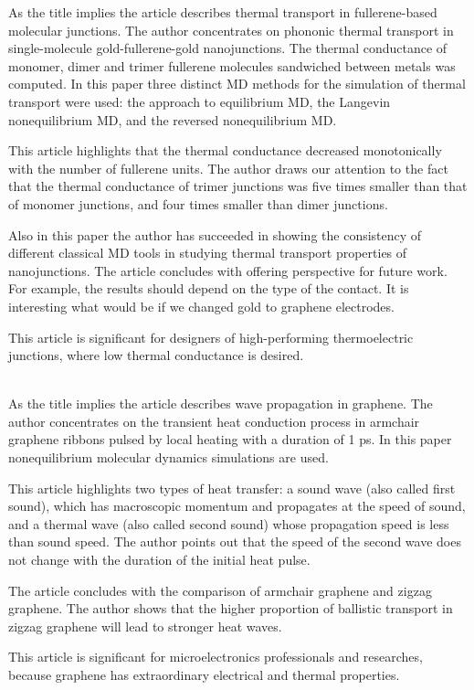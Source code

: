 \documentclass[main.tex]{subfiles}
\begin{document}
\setcounter{subsection}{2}
As the title implies the article describes thermal transport in fullerene-based molecular junctions.
The author concentrates on phononic thermal transport in single-molecule gold-fullerene-gold nanojunctions.
The thermal conductance of monomer, dimer and trimer fullerene molecules sandwiched between metals was computed.
In this paper three distinct MD methods for the simulation of thermal transport were used: the approach to equilibrium MD, the Langevin nonequilibrium MD, and the reversed nonequilibrium MD.\par
This article highlights that the thermal conductance decreased monotonically with the number of fullerene units.
The author draws our attention to the fact that the thermal conductance of trimer junctions was five times smaller than that of monomer junctions, and four times smaller than dimer junctions.\par
Also in this paper the author has succeeded in showing the consistency of different classical MD tools in studying thermal transport properties of nanojunctions.
The article concludes with offering perspective for future work.
For example, the results should depend on the type of the contact.
It is interesting what would be if we changed gold to graphene electrodes.\par
This article is significant for designers of high-performing thermoelectric junctions, where low thermal conductance is desired.
\ \\\\
\newpage


\setcounter{subsection}{3}
As the title implies the article describes wave propagation in graphene.
The author concentrates on the transient heat conduction process in armchair graphene ribbons pulsed by local heating with a duration of 1 ps.
In this paper nonequilibrium molecular dynamics simulations are used.\par
This article highlights two types of heat transfer: a sound wave (also called first sound), which has macroscopic momentum and propagates at the speed of sound, and a thermal wave (also called second sound) whose propagation speed is less than sound speed.
The author points out that the speed of the second wave does not change with the duration of the initial heat pulse.\par
The article concludes with the comparison of armchair graphene and zigzag graphene. The author shows that the higher proportion of ballistic transport in zigzag graphene will lead to stronger heat waves.\par
This article is significant for microelectronics professionals and researches, because graphene has extraordinary electrical and thermal properties.
\ \\\\
\newpage
\end{document}
